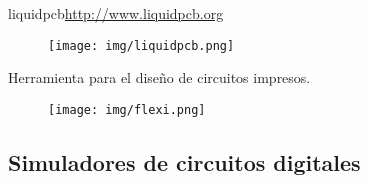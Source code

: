 \documentclass{beamer}
\begin{document}




\begin{frame}{liquidpcb}{\url{http://www.liquidpcb.org}}
  \begin{figure}[!h]
    \centering
    \texttt{[image: img/liquidpcb.png]}
  \end{figure}
  Herramienta para el diseño de circuitos impresos.
  \begin{figure}[!h]
    \centering
    \texttt{[image: img/flexi.png]}
  \end{figure}
\end{frame}

\subsection{Simuladores de circuitos digitales}
\end{document}
